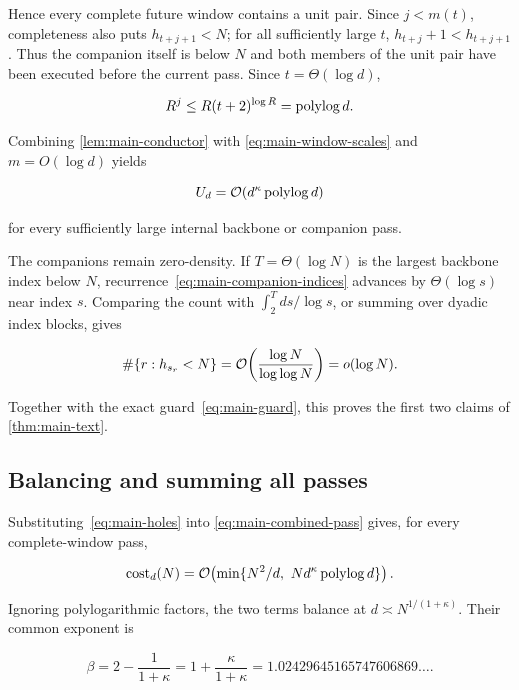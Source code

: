 Hence every complete future window contains a unit pair.  Since
$j<m(t)$, completeness also puts $h_{t+j+1}<N$; for all sufficiently large
$t$, $h_{t+j}+1<h_{t+j+1}$.  Thus the companion itself is below $N$ and both
members of the unit pair have been executed before the current pass.  Since
$t=\Theta(\log d)$,

\begin{equation}
  R^j\le R(t+2)^{\log R}=\operatorname{polylog} d.
  \label{eq:main-unit-polylog}
\end{equation}

Combining \cref{lem:main-conductor} with
\eqref{eq:main-window-scales} and $m=O(\log d)$ yields

\begin{equation}
  U_d=\mathcal{O}(d^\kappa\operatorname{polylog} d)
  \label{eq:main-holes}
\end{equation}

for every sufficiently large internal backbone or companion pass.

The companions remain zero-density.  If $T=\Theta(\log N)$ is the largest
backbone index below $N$, recurrence~\eqref{eq:main-companion-indices}
advances by $\Theta(\log s)$ near index $s$.  Comparing the count with
$\int_2^T ds/\log s$, or summing over dyadic index blocks, gives

\begin{equation}
  \#\{r:h_{s_r}<N\}
  =\mathcal{O}\!\left(\frac{\log N}{\log\log N}\right)
  =o(\log N).
  \label{eq:main-companion-count}
\end{equation}

Together with the exact guard~\eqref{eq:main-guard}, this proves the first
two claims of \cref{thm:main-text}.

\subsection{Balancing and summing all passes}

Substituting~\eqref{eq:main-holes} into
\eqref{eq:main-combined-pass} gives, for every complete-window pass,

\begin{equation}
  \operatorname{cost}_d(N)=\mathcal{O}\!\left(
    \min\{N^2/d,\ Nd^\kappa\operatorname{polylog} d\}
  \right).
  \label{eq:main-internal-pass}
\end{equation}

Ignoring polylogarithmic factors, the two terms balance at
$d\asymp N^{1/(1+\kappa)}$.  Their common exponent is

\begin{equation}
  \beta
  =2-\frac1{1+\kappa}
  =1+\frac{\kappa}{1+\kappa}
  =1.02429645165747606869\ldots.
  \label{eq:main-final-exponent}
\end{equation}


